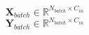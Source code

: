 \documentclass[fleqn,10pt]{wlscirep}
\begin{document}
$$\mathbf{X}_{batch}\in \mathbb{R}^{N_{batch}\times C_{in}}$$
$$\mathbf{Y}_{batch}\in \mathbb{R}^{N_{batch}\times C_{in}}$$
\end{document}
